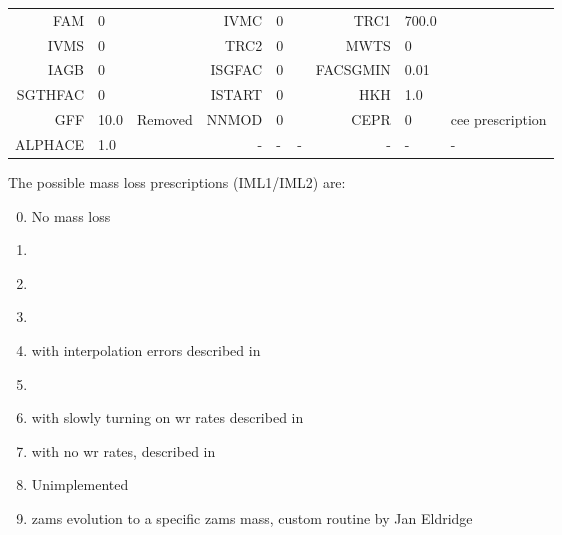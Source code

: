 \begin{table}
\begin{tabular}{rll|rll|rll}
             FAM & 0         &           &        IVMC & 0         &           &        TRC1 & 700.0     &           \\
            IVMS & 0         &           &        TRC2 & 0         &           &        MWTS & 0         &           \\
            IAGB & 0         &           &      ISGFAC & 0         &           &    FACSGMIN & 0.01      &           \\
         SGTHFAC & 0         &           &      ISTART & 0         &           &         HKH & 1.0       &           \\
             GFF & 10.0      & Removed   &       NNMOD & 0         &           &        CEPR & 0         & \gls{cee} prescription \\
         ALPHACE & 1.0       &           &           - & -         & -         &           - & -         & -         \\
    \bottomrule
     \end{tabular}
    \label{tab:general_initial_conditions_cont}
\end{table}

The possible mass loss prescriptions (IML1/IML2) are:

\begin{enumerate}
  \setcounter{enumi}{-1}
  \item No mass loss
  \item \citet{Reimers:1975}
  \item \citet{Bloecker:1995}
  \item \citet{Vassiliadis:1993}
  \item \citet{De_jager:1988, Nugis:2000, Vink:2001} with interpolation errors described in \citet{Richards:2024}
  \item \citet{De_jager:1988, Nugis:2000, Vink:2001} \citep[described in][]{Eldridge:2017}
  \item \citet{De_jager:1988, Nugis:2000, Vink:2001} with slowly turning on \gls{wr} rates described in \citet{Richards:2024}
  \item \citet{De_jager:1988, Nugis:2000, Vink:2001} with no \gls{wr} rates, described in \citet{Richards:2024}
  \item Unimplemented
  \item \gls{zams} evolution to a specific \gls{zams} mass, custom routine by Jan Eldridge
\end{enumerate}